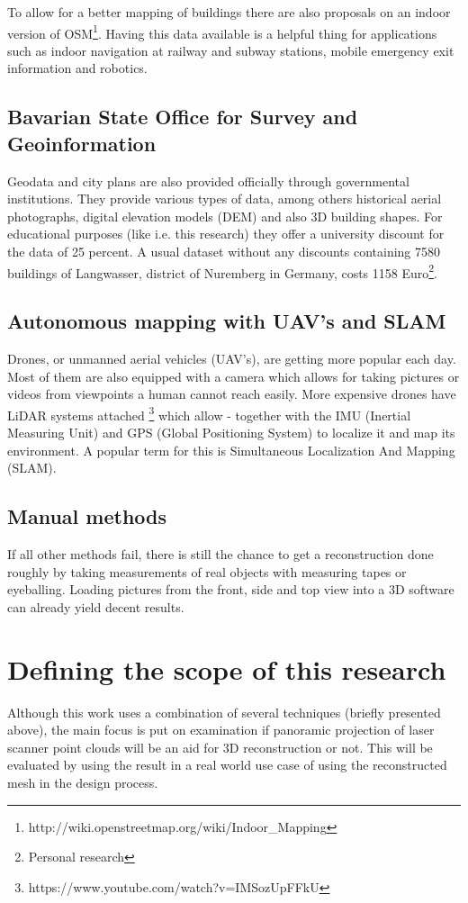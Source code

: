 To allow for a better mapping of buildings there are also proposals on an indoor version of OSM\footnote{http://wiki.openstreetmap.org/wiki/Indoor\_Mapping}. Having this data available is a helpful thing for applications such as indoor navigation at railway and subway stations, mobile emergency exit information and robotics.

\subsection{Bavarian State Office for Survey and Geoinformation}

Geodata and city plans are also provided officially through governmental institutions. They provide various types of data, among others historical aerial photographs, digital elevation models (DEM) and also 3D building shapes. For educational purposes (like i.e. this research) they offer a university discount for the data of 25 percent. A usual dataset without any discounts containing 7580 buildings of Langwasser, district of Nuremberg in Germany, costs 1158 Euro\footnote{Personal research}.

\subsection{Autonomous mapping with UAV's and SLAM}

Drones, or unmanned aerial vehicles (UAV's), are getting more popular each day. Most of them are also equipped with a camera which allows for taking pictures or videos from viewpoints a human cannot reach easily. More expensive drones have LiDAR systems attached \footnote{https://www.youtube.com/watch?v=IMSozUpFFkU} which allow - together with the IMU (Inertial Measuring Unit) and GPS (Global Positioning System) to localize it and map its environment. A popular term for this is Simultaneous Localization And Mapping (SLAM).

\subsection{Manual methods}

If all other methods fail, there is still the chance to get a reconstruction done roughly by taking measurements of real objects with measuring tapes or eyeballing. Loading pictures from the front, side and top view into a 3D software can already yield decent results.

\section{Defining the scope of this research}

Although this work uses a combination of several techniques (briefly presented above), the main focus is put on examination if panoramic projection of laser scanner point clouds will be an aid for 3D reconstruction or not. This will be evaluated by using the result in a real world use case of using the reconstructed mesh in the design process.